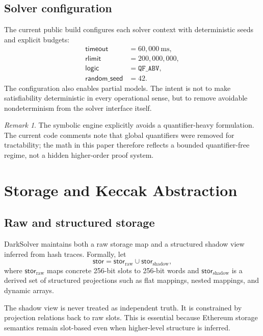 \documentclass[11pt]{article}
\numberwithin{equation}{section}
\theoremstyle{remark}
\newtheorem{remark}[definition]{Remark}
\newcommand{\QFABV}{\texttt{QF\_ABV}}
\newcommand{\Storage}{\mathsf{stor}}
\begin{document}
\subsection{Solver configuration}

The current public build configures each solver context with deterministic seeds and explicit budgets:
\begin{align}
\mathsf{timeout} &= 60{,}000\ \mathrm{ms}, \\
\mathsf{rlimit} &= 200{,}000{,}000, \\
\mathsf{logic} &= \QFABV, \\
\mathsf{random\_seed} &= 42.
\end{align}
The configuration also enables partial models. The intent is not to make satisfiability deterministic in every operational sense, but to remove avoidable nondeterminism from the solver interface itself.

\begin{remark}
The symbolic engine explicitly avoids a quantifier-heavy formulation. The current code comments note that global quantifiers were removed for tractability; the math in this paper therefore reflects a bounded quantifier-free regime, not a hidden higher-order proof system.
\end{remark}

\section{Storage and Keccak Abstraction}
\label{sec:storage-keccak}

\subsection{Raw and structured storage}

DarkSolver maintains both a raw storage map and a structured shadow view inferred from hash traces. Formally, let
\begin{equation}
\label{eq:storage-views}
\Storage = \Storage_{\mathrm{raw}} \cup \Storage_{\mathrm{shadow}},
\end{equation}
where \(\Storage_{\mathrm{raw}}\) maps concrete 256-bit slots to 256-bit words and \(\Storage_{\mathrm{shadow}}\) is a derived set of structured projections such as flat mappings, nested mappings, and dynamic arrays.

The shadow view is never treated as independent truth. It is constrained by projection relations back to raw slots. This is essential because Ethereum storage semantics remain slot-based even when higher-level structure is inferred.
\end{document}
